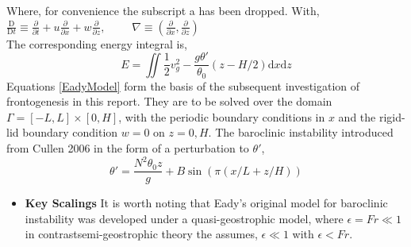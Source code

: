 Where, for convenience the subscript a has been dropped. With,\\
$\frac{\mathrm{D}}{\mathrm{D}t} \equiv \frac{\partial}{\partial t} + u\frac{\partial}{\partial x} + w\frac{\partial}{\partial z},\qquad$ 
$\nabla \equiv \left(\frac{\partial}{\partial x},\frac{\partial}{\partial z}\right)$\\
\linebreak
The corresponding energy integral is,
\begin{equation}
	E = \iint \frac{1}{2}v_g^2 - \frac{g\theta'}{\theta_0}\left(z - H/2\right)\textrm{d}x\textrm{d}z
\end{equation}
Equations \ref{EadyModel} form the basis of the subsequent investigation of frontogenesis in this report. They are to be solved over the domain $\Gamma = [-L,L] \times [0,H]$, with the periodic boundary conditions in $x$ and the rigid-lid boundary condition $w = 0$ on $z = 0,H$. The baroclinic instability introduced from Cullen 2006 \cite{Cullen2006a} in the form of a perturbation to $\theta'$, 
\begin{equation}
	\theta' = \frac{N^2\theta_0 z}{g} + B\sin\left(\pi\left(x/L + z/H\right)\right)
\label{thetap}
\end{equation}
\begin{itemize}
	\item \textbf{Key Scalings}
	It is worth noting that Eady's original model for baroclinic instability was developed under a quasi-geostrophic model, where $\epsilon = Fr \ll 1$ in contrastsemi-geostrophic theory the assumes, $\epsilon \ll 1$ with $\epsilon < Fr$.
\end{itemize}
